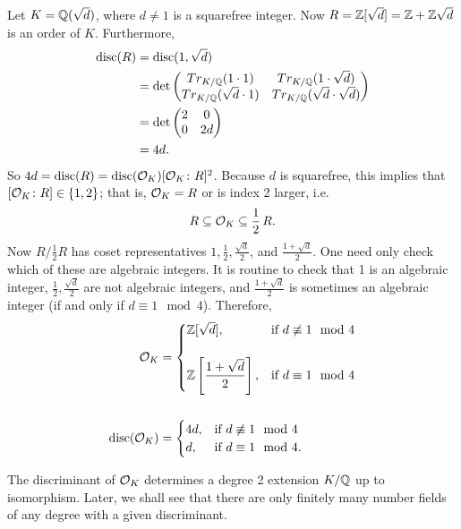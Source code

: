 \begin{ex}
Let $K= \mathbb{Q}(\sqrt{d})$, where $d \neq 1$ is a squarefree integer. Now $R= \mathbb{Z}[\sqrt{d}]= \mathbb{Z} + \mathbb{Z} \sqrt{d}$ is an order of $K$. Furthermore,
	\[
	\begin{split}
	\operatorname{disc}(R)&= \operatorname{disc}(1,\sqrt{d}) \\
	&= \det \begin{pmatrix}
	Tr_{K/\mathbb{Q}}(1 \cdot 1) & Tr_{K/\mathbb{Q}}(1 \cdot \sqrt{d}) \\
	Tr_{K/\mathbb{Q}}(\sqrt{d} \cdot 1) & Tr_{K/\mathbb{Q}}(\sqrt{d} \cdot \sqrt{d})
	\end{pmatrix} \\
	&= \det \begin{pmatrix} 2 & 0 \\ 0 & 2d \end{pmatrix} \\
	&= 4d.
	\end{split}
	\]
So $4d= \operatorname{disc}(R)= \operatorname{disc}(\mathcal{O}_K) [\mathcal{O}_K \colon R]^2$. Because $d$ is squarefree, this implies that $[\mathcal{O}_K \colon R] \in \{ 1, 2 \}$; that is, $\mathcal{O}_K= R$ or is index 2 larger, i.e.	
	\[
	R \subseteq \mathcal{O}_K \subseteq \dfrac{1}{2}\, R.
	\]
Now $R / \frac{1}{2}R$ has coset representatives $1, \frac{1}{2}, \frac{\sqrt{d}}{2}$, and $\frac{1 + \sqrt{d}}{2}$. One need only check which of these are algebraic integers. It is routine to check that 1 is an algebraic integer, $\frac{1}{2}, \frac{\sqrt{d}}{2}$ are not algebraic integers, and $\frac{1 + \sqrt{d}}{2}$ is sometimes an algebraic integer (if and only if $d \equiv 1 \mod 4$). Therefore,
	\[
	\begin{split}
	\mathcal{O}_K&=
	\begin{cases}
	\mathbb{Z}[\sqrt{d}], & \text{if } d \not\equiv 1 \mod 4 \\ \\
	\mathbb{Z}\left[ \dfrac{1 + \sqrt{d}}{2} \right], & \text{if } d \equiv 1 \mod 4
	\end{cases} \\ \\
	\operatorname{disc}(\mathcal{O}_K)&=
	\begin{cases}
	4d, & \text{if } d \not\equiv 1 \mod 4 \\
	d, & \text{if } d \equiv 1 \mod 4.
	\end{cases}
	\end{split}
	\] \xqed \pskip
\end{ex}


\begin{rem}
The discriminant of $\mathcal{O}_K$ determines a degree 2 extension $K/\mathbb{Q}$ up to isomorphism. Later, we shall see that there are only finitely many number fields of any degree with a given discriminant. 
\end{rem}


